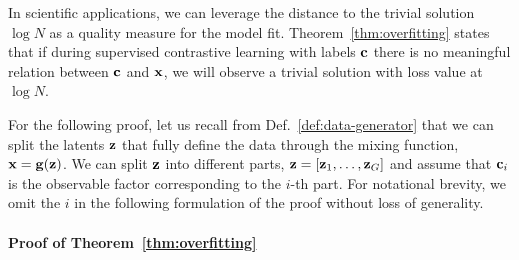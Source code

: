     In scientific applications, we can leverage the distance to the trivial solution $\log N$ as a quality measure for the model fit.
    Theorem~\ref{thm:overfitting} states that if during supervised contrastive learning with labels $\mathbf{c}$ there is no meaningful relation between $\mathbf{c}$ and $\mathbf{x}$, we will observe a trivial solution with loss value at $\log N$.

    For the following proof, let us recall from Def.~\ref{def:data-generator} that we can split the latents $\mathbf{z}$ that fully define the data through the mixing function, $\mathbf{x} = \mathbf{g}(\mathbf{z})$. We can split $\mathbf{z}$ into different parts, $\mathbf{z} = [\mathbf{z}_1, \dots, \mathbf{z}_G]$ and assume that $\mathbf{c}_i$ is the observable factor corresponding to the $i$-th part. For notational brevity, we omit the $i$ in the following formulation of the proof without loss of generality.
    
    \paragraph{Proof of Theorem~\ref{thm:overfitting}}

